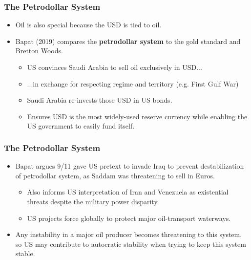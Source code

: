 \documentclass{beamer}
\begin{document}
\begin{frame} 
	\frametitle{\LARGE{The Petrodollar System}}
	\begin{itemize}
		
		\item Oil is also special because the USD is tied to oil. \pause 
		\item Bapat (2019) compares the \textbf{petrodollar system} to the gold standard and Bretton Woods. \pause 
		\begin{itemize}
			\item US convinces Saudi Arabia to sell oil exclusively in USD... \pause 
			\item ...in exchange for respecting regime and territory (e.g. First Gulf War) \pause 
			\item Saudi Arabia re-invests those USD in US bonds.  \pause 
			\item Ensures USD is the most widely-used reserve currency while enabling the US government to easily fund itself.   
		\end{itemize}
		
	\end{itemize}
\end{frame}


\begin{frame} 
	\frametitle{\LARGE{The Petrodollar System}}
	\begin{itemize}
		
		\item Bapat argues 9/11 gave US pretext to invade Iraq to prevent destabilization of petrodollar system, as Saddam was threatening to sell in Euros.  \pause 
		\begin{itemize}
			\item Also informs US interpretation of Iran and Venezuela as existential threats despite the military power disparity.  \pause 
			\item US projects force globally to protect major oil-transport waterways. \pause 
		\end{itemize}
		\item Any instability in a major oil producer becomes threatening to this system, so US may contribute to autocratic stability when trying to keep this system stable.
		
	\end{itemize}
\end{frame}


\end{document}
